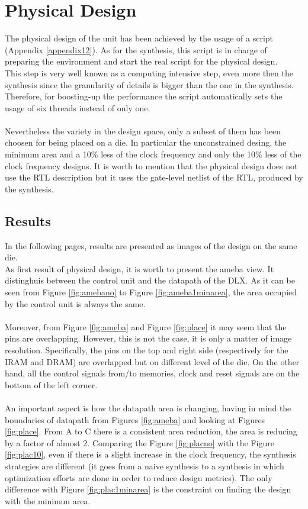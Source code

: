 \chapter{Physical Design}
\label{pd}
The physical design of the unit has been achieved by the usage of a script (Appendix \ref{appendix12}). As for the synthesis, this script is in charge of preparing the environment and start the real script for the physical design.\\ This step is very well known as a computing intensive step, even more then the synthesis since the granularity of details is bigger than the one in the synthesis. Therefore, for boosting-up the performance the script automatically sets the usage of six threads instead of only one.\\\\
Nevertheless the variety in the design space, only a subset of them has been choosen for being placed on a die. In particular the unconstrained desing, the minimum area and a 10\% less of the clock frequency and only the 10\% less of the clock frequency designs. It is worth to mention that the physical design does not use the RTL description but it uses the gate-level netlist of the RTL, produced by the synthesis.\\
\section{Results}
In the following pages, results are presented as images of the design on the same die.\\
As first result of physical design, it is worth to present the ameba view. It distinghuis between the control unit and the datapath of the DLX. As it can be seen from Figure \ref{fig:amebano} to Figure \ref{fig:ameba1minarea}, the area occupied by the control unit is always the same.\\\\
Moreover, from Figure \ref{fig:ameba} and Figure \ref{fig:place} it may seem that the pins are overlapping. However, this is not the case, it is only a matter of image resolution. Specifically, the pins on the top and right side (respectively for the IRAM and DRAM) are overlapped but on different level of the die. On the other hand, all the control signals from/to memories, clock and reset signals are on the bottom of the left corner.\\\\
An important aspect is how the datapath area is changing, having in mind the boundaries of datapath from Figures \ref{fig:ameba} and looking at Figures \ref{fig:place}. From A to C there is a consistent area reduction, the area is reducing by a factor of almost 2. Comparing the Figure \ref{fig:placno} with the Figure \ref{fig:plac10}, even if there is a slight increase in the clock frequency, the synthesis strategies are different (it goes from a naive synthesis to a synthesis in which optimization efforts are done in order to reduce design metrics). The only difference with Figure \ref{fig:plac1minarea} is the constraint on finding the design with the minimun area.

